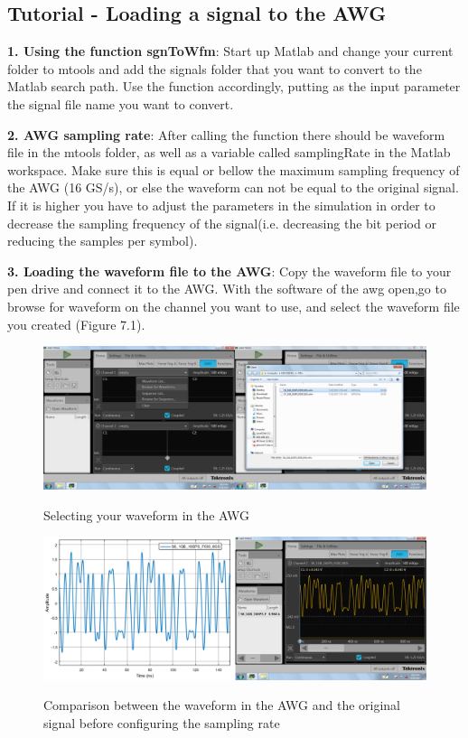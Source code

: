\subsection*{Tutorial - Loading a signal to the AWG}

\textbf{1. Using the function sgnToWfm}:
Start up Matlab and change your current folder to mtools and add the signals folder that you want to convert to the Matlab search path. Use the function accordingly, putting as the input parameter the signal file name you want to convert.
\bigskip

\noindent
\textbf{2. AWG sampling rate}:
After calling the function there should be waveform file in the mtools folder, as well as a variable called samplingRate in the Matlab workspace. Make sure this is equal or bellow the maximum sampling frequency of the AWG (16 GS/s), or else the waveform can not be equal to the original signal. If it is higher you  have to adjust the parameters in the simulation in order to decrease the sampling frequency of the signal(i.e. decreasing the bit period or reducing the samples per symbol).
\bigskip

\noindent
\textbf{3. Loading the waveform file to the AWG}:
Copy the waveform file to your pen drive and connect it to the AWG. With the software of the awg open,go to browse for waveform on the channel you want to use, and select the waveform file you created (Figure 7.1).

\begin{figure}[h]
	\centering
	\includegraphics[width=\textwidth]{../mtools/sgnToWfm/figures/tutorial1}
	\label{TUT_SelectingWFM}\caption{Selecting your waveform in the AWG}
\end{figure}
\begin{figure}[h]
	\centering
	\includegraphics[width=\textwidth]{../mtools/sgnToWfm/figures/tutorial2}
	\label{TUT_CompBad}\caption{Comparison between the waveform in the AWG and the original signal before configuring the sampling rate}
\end{figure}

